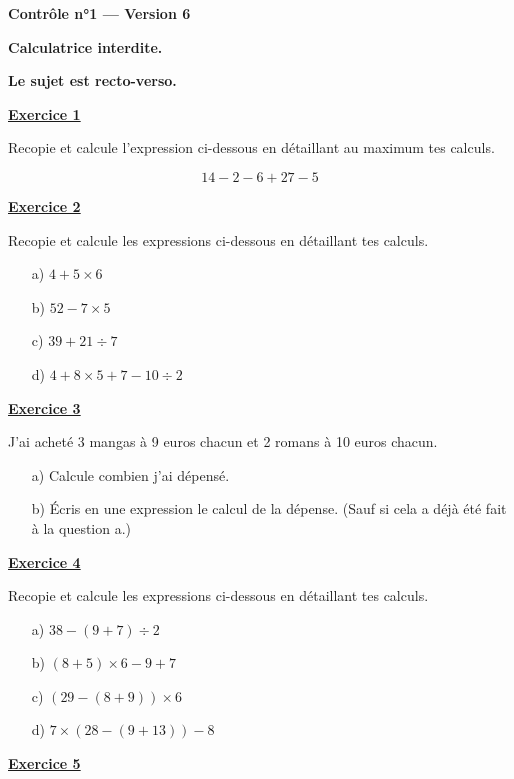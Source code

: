 \documentclass[13pt]{extarticle}
\newcommand{\exo}[1]{%
  \vspace{0.8em}%
  \noindent\large\underline{\textbf{Exercice #1}}%
  \vspace{0.2em}\par%
}
\newcommand{\entetecontrole}[1]{%
\begin{center}
\textbf{\huge{Contrôle n°1 --- Version #1}}
\end{center}

\begin{center}
\textbf{Calculatrice interdite.}\par
\textbf{Le sujet est recto-verso.}

\end{center}
}
\begin{document}
\entetecontrole{6}
\exo{1}

\noindent Recopie et calcule l'expression ci-dessous en détaillant au maximum tes calculs.

\[
14 - 2 - 6 + 27 - 5
\]

\exo{2}

\noindent Recopie et calcule les expressions ci-dessous en détaillant tes calculs.

\begin{itemize}
  \item[a)] $4 + 5 \times 6$
  \item[b)] $52 - 7 \times 5$
  \item[c)] $39 + 21 \div 7$
  \item[d)] $4 + 8 \times 5 + 7 - 10 \div 2$
\end{itemize}

\exo{3}

\noindent J'ai acheté 3 mangas à 9 euros chacun et 2 romans à 10 euros chacun.

\begin{itemize}
  \item[a)] Calcule combien j'ai dépensé.
  \item[b)] Écris en une expression le calcul de la dépense. (Sauf si cela a déjà été fait à la question a.)
\end{itemize}

\exo{4}

\noindent Recopie et calcule les expressions ci-dessous en détaillant tes calculs.

\begin{itemize}
  \item[a)] $38 - (9 + 7) \div 2$
  \item[b)] $(8 + 5) \times 6 - 9 + 7$
  \item[c)] $(29 - (8 + 9)) \times 6$
  \item[d)] $7 \times (28 - (9 + 13)) - 8$
\end{itemize}

\newpage

\exo{5}
\end{document}
